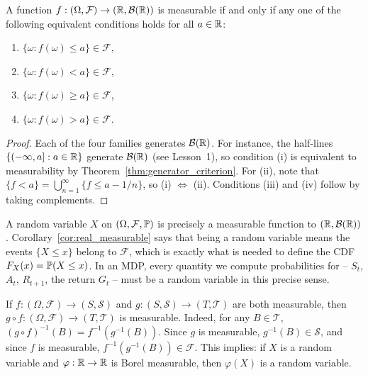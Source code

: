 \documentclass[11pt,a4paper]{article}
\begin{document}
\begin{corollary}
\label{cor:real_measurable}
A function $f: (\Omega, \mathcal{F}) \to (\mathbb{R}, \mathcal{B}(\mathbb{R}))$ is measurable if
and only if any one of the following equivalent conditions holds for all
$a \in \mathbb{R}$:
\begin{enumerate}[nosep,label=(\roman*)]
  \item $\{\omega : f(\omega) \leq a\} \in \mathcal{F}$,
  \item $\{\omega : f(\omega) < a\} \in \mathcal{F}$,
  \item $\{\omega : f(\omega) \geq a\} \in \mathcal{F}$,
  \item $\{\omega : f(\omega) > a\} \in \mathcal{F}$.
\end{enumerate}
\end{corollary}

\begin{proof}
Each of the four families generates $\mathcal{B}(\mathbb{R})$. For instance, the
half-lines $\{(-\infty, a] : a \in \mathbb{R}\}$ generate $\mathcal{B}(\mathbb{R})$ (see
Lesson~1), so condition (i) is equivalent to measurability by
Theorem~\ref{thm:generator_criterion}. For (ii), note that
$\{f < a\} = \bigcup_{n=1}^\infty \{f \leq a - 1/n\}$, so (i)
$\Leftrightarrow$ (ii). Conditions (iii) and (iv) follow by taking
complements.
\end{proof}

\begin{rlconnection}[title={Connection to RL}]
A random variable $X$ on $(\Omega, \mathcal{F}, \mathbb{P})$ is precisely a
measurable function to $(\mathbb{R}, \mathcal{B}(\mathbb{R}))$.
Corollary~\ref{cor:real_measurable} says that being a random variable means
the events $\{X \leq x\}$ belong to $\mathcal{F}$, which is exactly what
is needed to define the CDF $F_X(x) = \mathbb{P}(X \leq x)$. In an MDP, every
quantity we compute probabilities for -- $S_t$, $A_t$, $R_{t+1}$, the
return $G_t$ -- must be a random variable in this precise sense.
\end{rlconnection}

\begin{example}
\label{ex:composition}
If $f: (\Omega, \mathcal{F}) \to (S, \mathcal{S})$ and
$g: (S, \mathcal{S}) \to (T, \mathcal{T})$ are both measurable, then
$g \circ f: (\Omega, \mathcal{F}) \to (T, \mathcal{T})$ is measurable.
Indeed, for any $B \in \mathcal{T}$,
$(g \circ f)^{-1}(B) = f^{-1}(g^{-1}(B))$. Since $g$ is measurable,
$g^{-1}(B) \in \mathcal{S}$, and since $f$ is measurable,
$f^{-1}(g^{-1}(B)) \in \mathcal{F}$.
This implies: if $X$ is a random variable and $\varphi: \mathbb{R} \to \mathbb{R}$ is
Borel measurable, then $\varphi(X)$ is a random variable.
\end{example}
\end{document}
